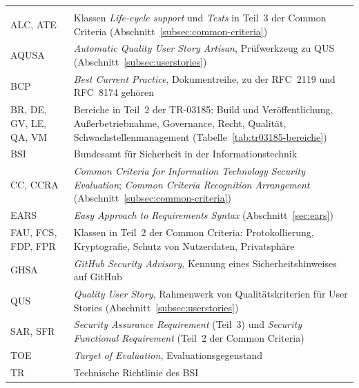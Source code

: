 \documentclass[11pt,a4paper]{report}
\begin{document}
{\small
\begin{longtable}{@{}>{\raggedright\arraybackslash}p{2.9cm}%
                   >{\raggedright\arraybackslash}p{10.6cm}@{}}
  \multicolumn{2}{@{}l}{\textbf{Fachspezifische Abkürzungen}} \\
  \midrule
  \endfirsthead
  \multicolumn{2}{@{}l}{\textbf{Fachspezifische Abkürzungen} (Fortsetzung)} \\
  \midrule
  \endhead
  ALC, ATE & Klassen \emph{Life-cycle support} und \emph{Tests} in Teil~3
        der Common Criteria (Abschnitt~\ref{subsec:common-criteria}) \\
  AQUSA & \emph{Automatic Quality User Story Artisan}, Prüfwerkzeug zu
        QUS (Abschnitt~\ref{subsec:userstories}) \\
  BCP & \emph{Best Current Practice}, Dokumentreihe, zu der RFC~2119 und
        RFC~8174 gehören \\
  BR, DE, GV, LE, QA, VM & Bereiche in Teil~2 der TR-03185: Build und
        Veröffentlichung, Außerbetriebnahme, Governance, Recht, Qualität,
        Schwachstellenmanagement (Tabelle~\ref{tab:tr03185-bereiche}) \\
  BSI & Bundesamt für Sicherheit in der Informationstechnik \\
  CC, CCRA & \emph{Common Criteria for Information Technology Security
        Evaluation}; \emph{Common Criteria Recognition Arrangement}
        (Abschnitt~\ref{subsec:common-criteria}) \\
  EARS & \emph{Easy Approach to Requirements Syntax}
        (Abschnitt~\ref{sec:ears}) \\
  FAU, FCS, FDP, FPR & Klassen in Teil~2 der Common Criteria:
        Protokollierung, Kryptografie, Schutz von Nutzerdaten,
        Privatsphäre \\
  GHSA & \emph{GitHub Security Advisory}, Kennung eines
        Sicherheitshinweises auf GitHub \\
  QUS & \emph{Quality User Story}, Rahmenwerk von Qualitätskriterien für
        User Stories (Abschnitt~\ref{subsec:userstories}) \\
  SAR, SFR & \emph{Security Assurance Requirement} (Teil~3) und
        \emph{Security Functional Requirement} (Teil~2 der Common
        Criteria) \\
  TOE & \emph{Target of Evaluation}, Evaluationsgegenstand \\
  TR & Technische Richtlinie des BSI \\
\end{longtable}
\clearpage
\begin{longtable}{@{}>{\raggedright\arraybackslash}p{2.9cm}%
                   >{\raggedright\arraybackslash}p{10.6cm}@{}}

\end{longtable}}
\end{document}
